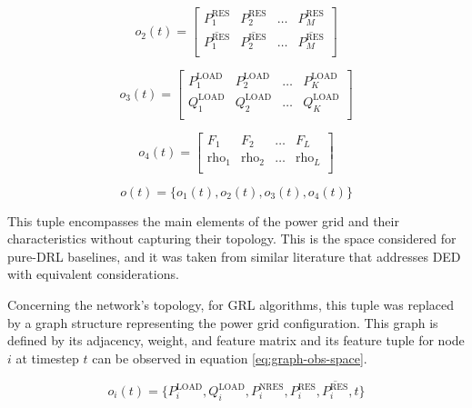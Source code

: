 \begin{description}
	\begin{equation} \label{eq:simple-obs-space2}
		o_{2}(t)= \begin{bmatrix}
			P^\text{RES}_1 & P^\text{RES}_2 & \dots & P^\text{RES}_{M} \\
			\overline{P^\text{RES}_1} & \overline{P^\text{RES}_2} & \dots & \overline{P^\text{RES}_{M}} \\
		\end{bmatrix}
	\end{equation}
	
	\begin{equation} \label{eq:simple-obs-space3}
		o_{3}(t)= \begin{bmatrix}
			P^\text{LOAD}_1 & P^\text{LOAD}_2 & \dots & P^\text{LOAD}_{K} \\
			Q^\text{LOAD}_1 & Q^\text{LOAD}_2 & \dots & Q^\text{LOAD}_{K} \\
		\end{bmatrix}
	\end{equation}
	
	\begin{equation} \label{eq:simple-obs-space4}
		o_{4}(t)= \begin{bmatrix}
			F_1 & F_2 & \dots & F_{L} \\
			\text{rho}_1 & \text{rho}_2 & \dots & \text{rho}_{L} \\
		\end{bmatrix}
	\end{equation}
	
	\begin{equation} \label{eq:simple-obs-space}
		o(t)= \{ o_{1}(t), o_{2}(t), o_{3}(t), o_{4}(t) \}
	\end{equation}
	
	This tuple encompasses the main elements of the power grid and their characteristics without capturing their topology. This is the space considered for pure-\ac{DRL} baselines, and it was taken from similar literature that addresses \ac{DED} with equivalent considerations. \par 
	Concerning the network's topology, for \ac{GRL} algorithms, this tuple was replaced by a graph structure representing the power grid configuration. This graph is defined by its adjacency, weight, and feature matrix and its feature tuple for node $i$ at timestep $t$ can be observed in equation \ref{eq:graph-obs-space}. 
	
	\begin{equation} \label{eq:graph-obs-space}
		o_i(t) = \{P^\text{LOAD}_i, Q^\text{LOAD}_i, P^\text{NRES}_i, P^\text{RES}_i, \overline{P^\text{RES}_i}, t\}
	\end{equation}
	

\end{description}
